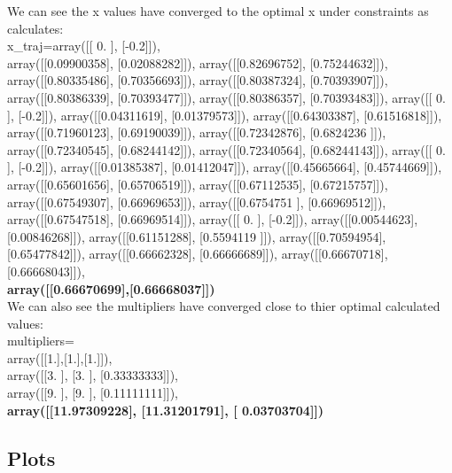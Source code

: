 \documentclass[12pt]{article}
\begin{document}
We can see the x values have converged to the optimal x under constraints as calculates:\\
x\_traj=array([[ 0. ], [-0.2]]),\\ array([[0.09900358],
       [0.02088282]]), array([[0.82696752],
       [0.75244632]]), array([[0.80335486],
       [0.70356693]]), array([[0.80387324],
       [0.70393907]]), array([[0.80386339],
       [0.70393477]]), array([[0.80386357],
       [0.70393483]]), array([[ 0. ],
       [-0.2]]), array([[0.04311619],
       [0.01379573]]), array([[0.64303387],
       [0.61516818]]), array([[0.71960123],
       [0.69190039]]), array([[0.72342876],
       [0.6824236 ]]), array([[0.72340545],
       [0.68244142]]), array([[0.72340564],
       [0.68244143]]), array([[ 0. ],
       [-0.2]]), array([[0.01385387],
       [0.01412047]]), array([[0.45665664],
       [0.45744669]]), array([[0.65601656],
       [0.65706519]]), array([[0.67112535],
       [0.67215757]]), array([[0.67549307],
       [0.66969653]]), array([[0.6754751 ],
       [0.66969512]]), array([[0.67547518],
       [0.66969514]]), array([[ 0. ],
       [-0.2]]), array([[0.00544623],
       [0.00846268]]), array([[0.61151288],
       [0.5594119 ]]), array([[0.70594954],
       [0.65477842]]), array([[0.66662328],
       [0.66666689]]), array([[0.66670718],
       [0.66668043]]),\\
       \textbf{array([[0.66670699],[0.66668037]])}\\

We can also see the multipliers have converged close to thier optimal calculated values:\\
multipliers=\\
array([[1.],[1.],[1.]]),\\
       array([[3.        ],
       [3.        ],
       [0.33333333]]),\\
       array([[9.        ],
       [9.        ],
       [0.11111111]]),\\
       \textbf{array([[11.97309228],
       [11.31201791],
       [ 0.03703704]])}
       
\subsection{Plots}
\end{document}

